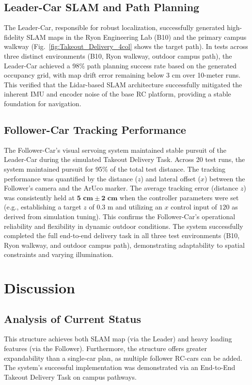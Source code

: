 \documentclass[journal,transmag]{IEEEtran}
\begin{document}
\subsection{Leader-Car SLAM and Path Planning}
The Leader-Car, responsible for robust localization, successfully generated high-fidelity SLAM maps in the Ryon Engineering Lab (B10) and the primary campus walkway (Fig.~\ref{fig:Takeout_Delivery_4col} shows the target path). In tests across three distinct environments (B10, Ryon walkway, outdoor campus path), the Leader-Car achieved a 98\% path planning success rate based on the generated occupancy grid, with map drift error remaining below $3\text{ cm}$ over 10-meter runs. This verified that the Lidar-based SLAM architecture successfully mitigated the inherent IMU and encoder noise of the base RC platform, providing a stable foundation for navigation.

\subsection{Follower-Car Tracking Performance}
The Follower-Car's visual servoing system maintained stable pursuit of the Leader-Car during the simulated Takeout Delivery Task. Across 20 test runs, the system maintained pursuit for 95\% of the total test distance. The tracking performance was quantified by the distance ($z$) and lateral offset ($x$) between the Follower's camera and the ArUco marker. The average tracking error (distance $z$) was consistently held at $\mathbf{5\text{ cm} \pm 2\text{ cm}}$ when the controller parameters were set (e.g., establishing a target $z$ of $0.3\text{ m}$ and utilizing an $x$ control input of $120$ as derived from simulation tuning). This confirms the Follower-Car’s operational reliability and flexibility in dynamic outdoor conditions. The system successfully completed the full end-to-end delivery task in all three test environments (B10, Ryon walkway, and outdoor campus path), demonstrating adaptability to spatial constraints and varying illumination.

\section{Discussion}

\subsection{Analysis of Current Status}
This structure achieves both SLAM map (via the Leader) and heavy loading features (via the Follower). Furthermore, the structure offers greater expandability than a single-car plan, as multiple follower RC-cars can be added. The system's successful implementation was demonstrated via an End-to-End Takeout Delivery Task on campus pathways.
\end{document}
